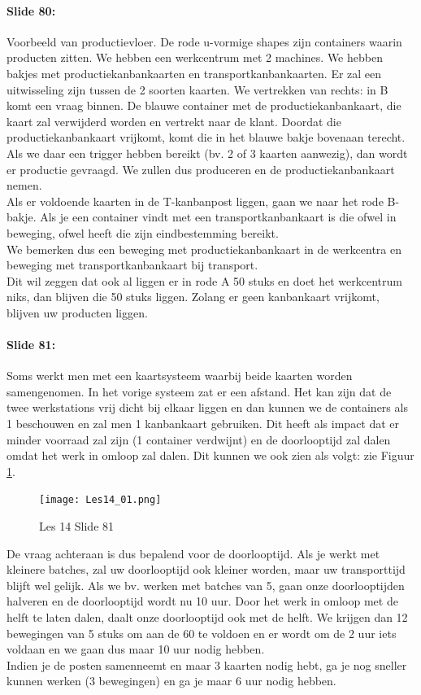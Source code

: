 \documentclass[10pt,a4paper]{report}
\begin{document}
\paragraph{Slide 80:} Voorbeeld van productievloer. De rode u-vormige shapes zijn containers waarin producten zitten. We hebben een werkcentrum met 2 machines. We hebben bakjes met productiekanbankaarten en transportkanbankaarten. Er zal een uitwisseling zijn tussen de 2 soorten kaarten. We vertrekken van rechts: in B komt een vraag binnen. De blauwe container met de productiekanbankaart, die kaart zal verwijderd worden en vertrekt naar de klant. Doordat die productiekanbankaart vrijkomt, komt die in het blauwe bakje bovenaan terecht. Als we daar een trigger hebben bereikt (bv. 2 of 3 kaarten aanwezig), dan wordt er productie gevraagd. We zullen dus produceren en de productiekanbankaart nemen. \\ %
Als er voldoende kaarten in de T-kanbanpost liggen, gaan we naar het rode B-bakje. Als je een container vindt met een transportkanbankaart is die ofwel in beweging, ofwel heeft die zijn eindbestemming bereikt. \\
We bemerken dus een beweging met productiekanbankaart in de werkcentra en beweging met transportkanbankaart bij transport.\\
Dit wil zeggen dat ook al liggen er in rode A 50 stuks en doet het werkcentrum niks, dan blijven die 50 stuks liggen. Zolang er geen kanbankaart vrijkomt, blijven uw producten liggen. 

\paragraph{Slide 81:} Soms werkt men met een kaartsysteem waarbij beide kaarten worden samengenomen. In het vorige systeem zat er een afstand. Het kan zijn dat de twee werkstations vrij dicht bij elkaar liggen en dan kunnen we de containers als 1 beschouwen en zal men 1 kanbankaart gebruiken. Dit heeft als impact dat er minder voorraad zal zijn (1 container verdwijnt) en de doorlooptijd zal dalen omdat het werk in omloop zal dalen. Dit kunnen we ook zien als volgt: zie Figuur \ref{les14_01}.\\

\begin{figure}[h!]
\centering
\texttt{[image: Les14\_01.png]}
\caption{Les 14 Slide 81} 
\label{les14_01}
\end{figure}

De vraag achteraan is dus bepalend voor de doorlooptijd. Als je werkt met kleinere batches, zal uw doorlooptijd ook kleiner worden, maar uw transporttijd blijft wel gelijk. Als we bv. werken met batches van 5, gaan onze doorlooptijden halveren en de doorlooptijd wordt nu 10 uur. Door het werk in omloop met de helft te laten dalen, daalt onze doorlooptijd ook met de helft. We krijgen dan 12 bewegingen van 5 stuks om aan de 60 te voldoen en er wordt om de 2 uur iets voldaan en we gaan dus maar 10 uur nodig hebben. \\
Indien je de posten samenneemt en maar 3 kaarten nodig hebt, ga je nog sneller kunnen werken (3 bewegingen) en ga je maar 6 uur nodig hebben. 
\end{document}
